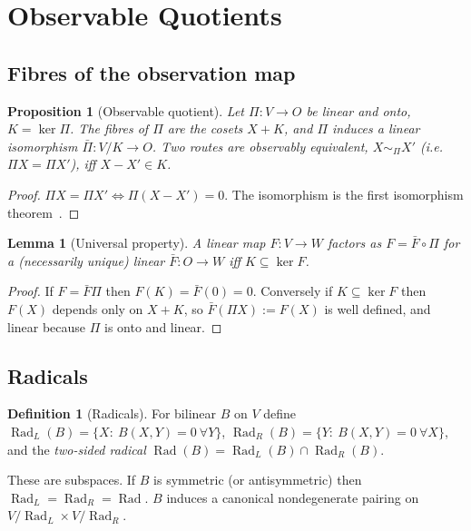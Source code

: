 \documentclass[11pt,a4paper]{article}
\newcommand{\Rad}{\operatorname{Rad}}
\newcommand{\obseq}{\sim_{\Pi}}
\theoremstyle{plain}
\newtheorem{proposition}[theorem]{Proposition}
\newtheorem{lemma}[theorem]{Lemma}
\theoremstyle{definition}
\newtheorem{definition}[theorem]{Definition}
\begin{document}
\section{Observable Quotients}\label{sec:quot}

\subsection{Fibres of the observation map}
\begin{proposition}[Observable quotient]\label{prop:quotient}
Let $\Pi\colon V\to O$ be linear and onto, $K=\ker\Pi$. The fibres of $\Pi$ are the cosets $X+K$, and $\Pi$ induces a linear isomorphism $\bar\Pi\colon V/K\to O$. Two routes are observably equivalent, $X\obseq X'$ (i.e.\ $\Pi X=\Pi X'$), iff $X-X'\in K$.
\end{proposition}
\begin{proof}
$\Pi X=\Pi X'\iff\Pi(X-X')=0$. The isomorphism is the first isomorphism theorem~\cite{Lan02}.
\end{proof}

\begin{lemma}[Universal property]\label{lem:universal}
A linear map $F\colon V\to W$ factors as $F=\bar F\circ\Pi$ for a (necessarily unique) linear $\bar F\colon O\to W$ iff $K\subseteq\ker F$.
\end{lemma}
\begin{proof}
If $F=\bar F\Pi$ then $F(K)=\bar F(0)=0$. Conversely if $K\subseteq\ker F$ then $F(X)$ depends only on $X+K$, so $\bar F(\Pi X):=F(X)$ is well defined, and linear because $\Pi$ is onto and linear.
\end{proof}

\subsection{Radicals}
\begin{definition}[Radicals]
For bilinear $B$ on $V$ define
$\Rad_L(B)=\{X:\ B(X,Y)=0\ \forall Y\}$, $\Rad_R(B)=\{Y:\ B(X,Y)=0\ \forall X\}$, and the \emph{two-sided radical} $\Rad(B)=\Rad_L(B)\cap\Rad_R(B)$.
\end{definition}
These are subspaces. If $B$ is symmetric (or antisymmetric) then $\Rad_L=\Rad_R=\Rad$.
$B$ induces a canonical nondegenerate pairing on $V/\Rad_L\times V/\Rad_R$.
\end{document}
